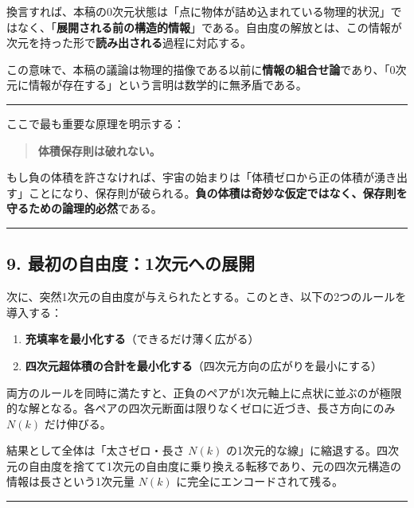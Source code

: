 \documentclass[a4paper,11pt]{ltjsarticle}
\theoremstyle{definition}
\providecommand{\tightlist}{\setlength{\itemsep}{0pt}\setlength{\parskip}{0pt}}
\begin{document}
換言すれば、本稿の0次元状態は「点に物体が詰め込まれている物理的状況」ではなく、「\textbf{展開される前の構造的情報}」である。自由度の解放とは、この情報が次元を持った形で\textbf{読み出される}過程に対応する。

この意味で、本稿の議論は物理的描像である以前に\textbf{情報の組合せ論}であり、「0次元に情報が存在する」という言明は数学的に無矛盾である。

\begin{center}\rule{0.5\linewidth}{0.5pt}\end{center}

ここで最も重要な原理を明示する：

\begin{quote}
\textbf{体積保存則は破れない。}
\end{quote}

もし負の体積を許さなければ、宇宙の始まりは「体積ゼロから正の体積が湧き出す」ことになり、保存則が破られる。\textbf{負の体積は奇妙な仮定ではなく、保存則を守るための論理的必然}である。

\begin{center}\rule{0.5\linewidth}{0.5pt}\end{center}

\subsection{9.
最初の自由度：1次元への展開}\label{ux6700ux521dux306eux81eaux7531ux5ea61ux6b21ux5143ux3078ux306eux5c55ux958b}

次に、突然1次元の自由度が与えられたとする。このとき、以下の2つのルールを導入する：

\begin{enumerate}
\def\labelenumi{\arabic{enumi}.}
\tightlist
\item
  \textbf{充填率を最小化する}（できるだけ薄く広がる）
\item
  \textbf{四次元超体積の合計を最小化する}（四次元方向の広がりを最小にする）
\end{enumerate}

両方のルールを同時に満たすと、正負のペアが1次元軸上に点状に並ぶのが極限的な解となる。各ペアの四次元断面は限りなくゼロに近づき、長さ方向にのみ
\(N(k)\) だけ伸びる。

結果として全体は「太さゼロ・長さ \(N(k)\)
の1次元的な線」に縮退する。四次元の自由度を捨てて1次元の自由度に乗り換える転移であり、元の四次元構造の情報は長さという1次元量
\(N(k)\) に完全にエンコードされて残る。

\begin{center}\rule{0.5\linewidth}{0.5pt}\end{center}
\end{document}
